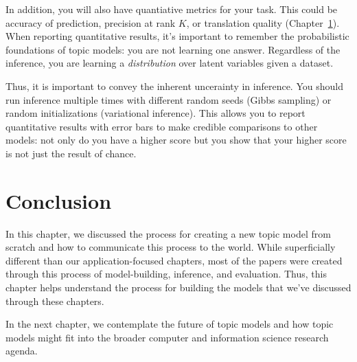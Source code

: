 In addition, you will also have quantiative metrics for your task.
This could be accuracy of prediction, precision at rank $K$, or
translation quality (Chapter~\ref{}).  When reporting quantitative
results, it's important to remember the probabilistic foundations of
topic models: you are not learning one answer.  Regardless of the
inference, you are learning a \emph{distribution} over latent
variables given a dataset.

Thus, it is important to convey the inherent uncerainty in inference.
You should run inference multiple times with different random seeds
(Gibbs sampling) or random initializations (variational inference).
This allows you to report quantitative results with error bars to make
credible comparisons to other models: not only do you have a higher
score but you show that your higher score is not just the result of
chance.

\section{Conclusion}

In this chapter, we discussed the process for creating a new topic
model from scratch and how to communicate this process to the world.
While superficially different than our application-focused chapters,
most of the papers were created through this process of
model-building, inference, and evaluation.  Thus, this chapter helps
understand the process for building the models that we've discussed
through these chapters.

In the next chapter, we contemplate the future of topic models and how
topic models might fit into the broader computer and information
science research agenda.
